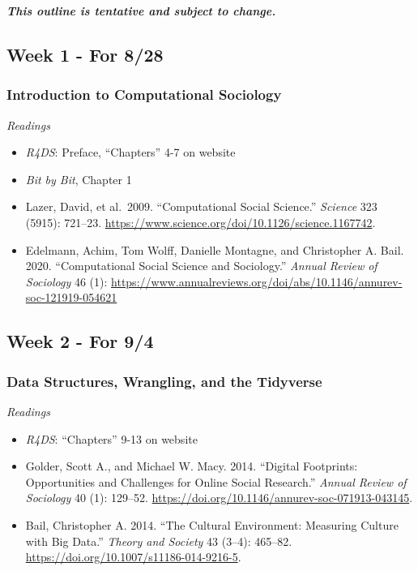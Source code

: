 \documentclass[
  10pt,
]{article}
\providecommand{\tightlist}{%
  \setlength{\itemsep}{0pt}\setlength{\parskip}{0pt}}
\begin{document}
\textbf{\emph{This outline is tentative and subject to change.}}

\hypertarget{week-1---for-828}{%
\subsection{Week 1 - For 8/28}\label{week-1---for-828}}

\hypertarget{introduction-to-computational-sociology}{%
\subsubsection{Introduction to Computational
Sociology}\label{introduction-to-computational-sociology}}

\emph{Readings}

\begin{itemize}
\tightlist
\item
  \emph{R4DS}: Preface, ``Chapters'' 4-7 on website
\item
  \emph{Bit by Bit}, Chapter 1
\item
  Lazer, David, et al.~2009. ``Computational Social Science.''
  \emph{Science} 323 (5915): 721--23.
  \url{https://www.science.org/doi/10.1126/science.1167742}.
\item
  Edelmann, Achim, Tom Wolff, Danielle Montagne, and Christopher A.
  Bail. 2020. ``Computational Social Science and Sociology.''
  \emph{Annual Review of Sociology} 46 (1):
  \url{https://www.annualreviews.org/doi/abs/10.1146/annurev-soc-121919-054621}
\end{itemize}

\hypertarget{week-2---for-94}{%
\subsection{Week 2 - For 9/4}\label{week-2---for-94}}

\hypertarget{data-structures-wrangling-and-the-tidyverse}{%
\subsubsection{Data Structures, Wrangling, and the
Tidyverse}\label{data-structures-wrangling-and-the-tidyverse}}

\emph{Readings}

\begin{itemize}
\tightlist
\item
  \emph{R4DS}: ``Chapters'' 9-13 on website
\item
  Golder, Scott A., and Michael W. Macy. 2014. ``Digital Footprints:
  Opportunities and Challenges for Online Social Research.''
  \emph{Annual Review of Sociology} 40 (1): 129--52.
  \url{https://doi.org/10.1146/annurev-soc-071913-043145}.
\item
  Bail, Christopher A. 2014. ``The Cultural Environment: Measuring
  Culture with Big Data.'' \emph{Theory and Society} 43 (3--4): 465--82.
  \url{https://doi.org/10.1007/s11186-014-9216-5}.
\end{itemize}
\end{document}
